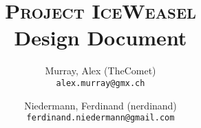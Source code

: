 \author{%
    Murray, Alex (TheComet)\\
    \texttt{alex.murray@gmx.ch}

    \and
    Niedermann, Ferdinand (nerdinand)\\
    \texttt{ferdinand.niedermann@gmail.com}

    
}

\title{
    \Huge{\textsc{Project IceWeasel}} \\
    \vspace{5mm}
    \small{Design Document}
    \vspace{5mm}
}
